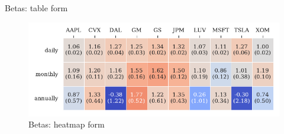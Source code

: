 \documentclass{article}
\begin{document}
\pagebreak
\begin{table}[h!]
	\setlength\tabcolsep{3pt}
	\small
	\centering
	\caption{\normalsize Betas: table form}
	
\end{table}

\vspace{24pt}

\begin{figure}[h!]
	\caption{Betas: heatmap form}
	\centering
	\includegraphics{betas-hmap.pdf}
\end{figure}
\end{document}
